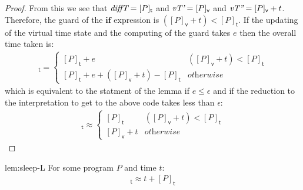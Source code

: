 \documentclass[preprint]{sigplanconf}
\renewcommand{\leq}{\leqslant}
\newcommand{\note}[1]{{\color{blue}{#1}}}
\theoremstyle{definition}
\newcommand{\sleep}{\mathsf{sleep}\;}
\newcommand{\vtime}[1]{[#1]_{\mathsf{v}}}
\newcommand{\etime}[1]{[#1]_{\mathsf{t}}}
\begin{document}
\begin{proof}
From this we see that $\emph{diffT} = \etime{P}$ and $\emph{vT'} = \vtime{P}$ and
 $\emph{vT''} = \vtime{P} + t$. Therefore, the guard of the
\ensuremath{\mathbf{if}} expression is $(\vtime{P} + t) < \etime{P}$.
If the updating of the virtual time state and the computing of
the guard takes $e$ then the overall time taken is:
\begin{align*}
\etime{P; \sleep{} t} =
 \begin{cases}
   \etime{P} + e & (\vtime{P} + t) < \etime{P}  \\
   \etime{P} + e + (\vtime{P} + t) - \etime{P}  & \textit{otherwise}
 \end{cases}
\end{align*}
which is equivalent to the statment of the lemma if $e \leq \epsilon$
and if the reduction to the interpretation to get to the above code
takes less than $\epsilon$:
\begin{align*}
\etime{P; \sleep{} t} \approx
 \begin{cases}
   \etime{P} & (\vtime{P} + t) < \etime{P} \\
   \vtime{P} + t  &  \textit{otherwise}
 \end{cases}
\end{align*}
\end{proof}

\note{I suppose this is ok- I'm a bit wary about saying the simplification
takes less than $\epsilon$. It surely does, but I am only hand waving.
We could time $e$ though in the model and show it is less than the schedule
time. We could go further and time the analogous parts of the Sonic Pi implementation
to check that the real $e$ is less than $\epsilon$. This would be good.}

\begin{replemma}{lem:sleep-L}
For some program $P$ and time $t$:
\begin{align*}
\etime{\sleep{} t; P} \approx t + \etime{P}
\end{align*}
\end{replemma}
\end{document}
